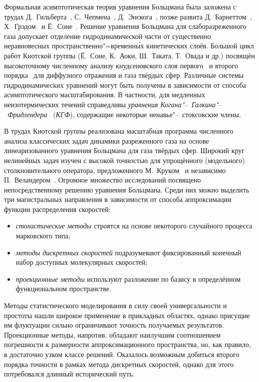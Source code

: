 {\progress}

Формальная асимптотическая теория уравнения Больцмана была заложена с трудах Д.~Гильберта~\autocite{Hilbert1912},
С.~Чепмена~\autocite{Chapman1916}, Д.~Энскога~\autocite{Enskog1917},
позже развита Д.~Барнеттом~\autocite{Burnett1935}, Х.~Грэдом~\autocite{Grad1963a} и Ё.~Соне~\autocite{Sone2002}.
Решение уравнения Больцмана для слаборазреженного газа допускает отделение гидродинамической части
от существенно неравновесных пространственно"=временн\'{ы}х кинетических слоёв.
Большой цикл работ Киотской группы (Ё.~Соне, К.~Аоки, Ш.~Таката, Т.~Овада и др.)
посвящён высокоточному численному анализу кнудсеновского слоя первого~\autocite{Ohwada1989creep, Ohwada1989jump}
и второго порядка~\autocite{Ohwada1992, Takata2015second, Takata2015curvature}
для диффузного отражения и газа твёрдых сфер.
Различные системы гидродинамических уравнений могут быть получены в зависимости от способа асимптотического масштабирования.
В частности, для медленных неизотермических течений справедливы
\emph{уравнения Когана"--~Галкина"--~Фридлендера}~\autocite{Kogan1976} (\emph{КГФ}),
содержащие некоторые ненавье"--~стоксовские члены.

В трудах Киотской группы реализована масштабная программа численного анализа классических задач
динамики разреженного газа на основе линеаризованного уравнения Больцмана для газа твёрдых сфер.
Широкий круг нелинейных задач изучен с высокой точностью для упрощённого (модельного) столкновительного оператора,
предложенного М.~Круком~\autocite{Krook1954} и независимо П.~Веландером~\autocite{Welander1954}.
Огромное множество исследований посвящено непосредственному решению уравнения Больцмана.
Среди них можно выделить три магистральных направления в зависимости от способа аппроксимации
функции распределения скоростей:
\begin{itemize}
    \item \emph{стохастические методы} строятся на основе некоторого случайного процесса марковского типа;
    \item \emph{методы дискретных скоростей} подразумевают фиксированный конечный набор доступных молекулярных скоростей;
    \item \emph{проекционные методы} используют разложение по базису в определённом функциональном пространстве.
\end{itemize}
Методы статистического моделирования в силу своей универсальности и простоты нашли широкое применение в прикладных областях,
однако присущие им флуктуации сильно ограничивают точность получаемых результатов.
Проекционные методы, напротив, обладают наилучшим соотношением погрешности к размерности аппроксимационного пространства,
но, как правило, в достаточно узком классе решений.
Оказалось возможным добиться второго порядка точности в рамках метода дискретных скоростей,
однако для этого потребовался длинный исторический путь.

